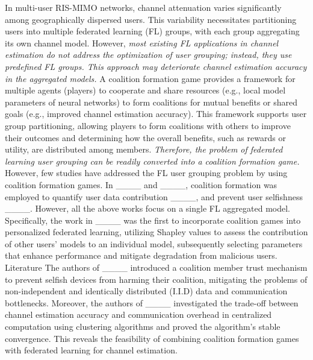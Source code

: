 In multi-user RIS-MIMO networks, channel attenuation varies significantly among geographically dispersed users. This variability necessitates partitioning users into multiple federated learning (FL) groups, with each group aggregating its own channel model. 
However, \emph{most existing FL applications in channel estimation do not address the optimization of user grouping; instead, they use predefined FL groups. This approach  may deteriorate channel estimation accuracy in the aggregated models.}
A coalition formation game provides a framework for multiple agents (players) to cooperate and share resources (e.g., local model parameters of neural networks) to form coalitions for mutual benefits or shared goals (e.g., improved channel estimation accuracy). This framework supports user group partitioning,   allowing players to form coalitions with others to improve their outcomes  and determining  how the overall benefits, such as rewards  or utility, are distributed among members. \emph{Therefore, the problem of federated learning user grouping can be readily converted into a coalition formation game.} However, few studies have addressed the FL user grouping problem by using coalition formation games.
In ____ and ____, coalition formation was employed to quantify user data contribution ____, and prevent user selfishness ____. However, all the above works focus on a single FL aggregated model. Specifically,  the work in ____ was the first to incorporate coalition games into personalized federated learning, utilizing Shapley values to assess the contribution of other users' models to an individual model, subsequently selecting parameters that enhance performance and mitigate degradation from malicious users. Literature The authors of ____ introduced a coalition member trust mechanism to prevent selfish devices from harming their coalition, mitigating the problems of non-independent and identically distributed (I.I.D) data and communication bottlenecks. 
Moreover, the authors of ____ investigated the trade-off between channel estimation accuracy and communication overhead in centralized computation using clustering algorithms and proved the algorithm's stable convergence. This   reveals the feasibility of combining coalition formation games with federated learning for channel estimation.

